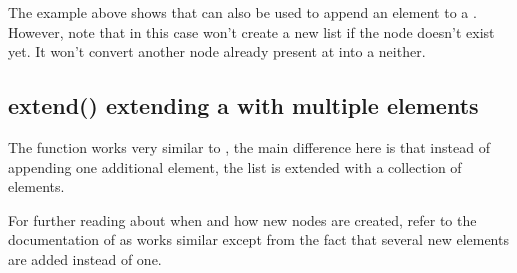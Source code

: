 \documentclass[a4paper,10pt,english]{sphinxmanual}
\begin{document}
\sphinxAtStartPar
The example above shows that  can also be used to append an element to a . However, note that  in this case won’t create a new list if the node doesn’t exist yet. It won’t convert another node already present at  into a  neither.


\subsection{extend() \textendash{} extending a  with multiple elements}
\label{\detokenize{README:extend-extending-a-list-with-multiple-elements}}
\sphinxAtStartPar
The  function works very similar to {\hyperref[\detokenize{README:append----adding-a-new-element-to-a-list}]{\emph{}}}, the main difference here is that instead of appending one additional element, the list is extended with a collection of elements.

\begin{sphinxVerbatim}[commandchars=\\\{\},numbers=left,firstnumber=1,stepnumber=1]
     
\end{sphinxVerbatim}

\sphinxAtStartPar
For further reading about when and how new \sphinxhyphen{}nodes are created, refer to the documentation of {\hyperref[\detokenize{README:append----adding-a-new-element-to-a-list}]{\emph{}}} as  works similar except from the fact that several new elements are added instead of one.
\end{document}

